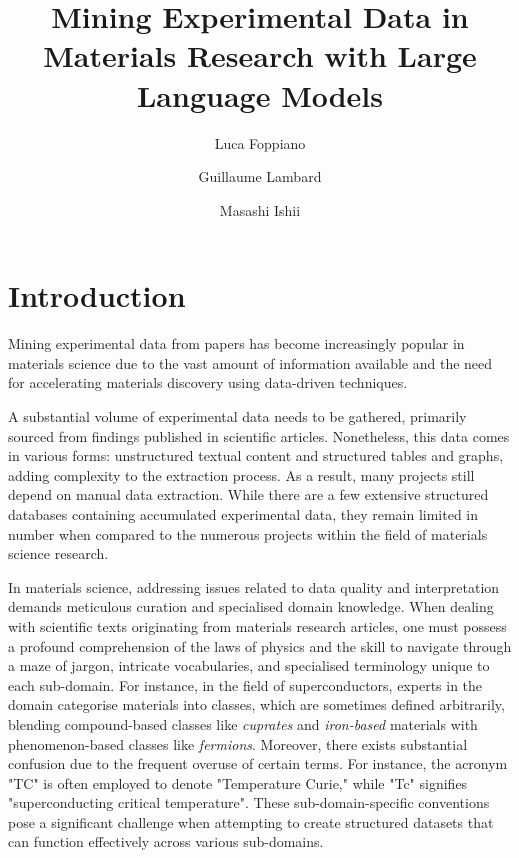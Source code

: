 \documentclass[a4paper]{article}
\title{Mining Experimental Data in Materials Research with Large Language Models}
\author[1]{Luca Foppiano}
\author[1]{Guillaume Lambard}
\author[1]{Masashi Ishii}
\affil[1]{NIMS}
\begin{document}
\maketitle

\section{Introduction}

Mining experimental data from papers has become increasingly popular in materials science due to the vast amount of information available and the need for accelerating materials discovery using data-driven techniques.

A substantial volume of experimental data needs to be gathered, primarily sourced from findings published in scientific articles.
Nonetheless, this data comes in various forms: unstructured textual content and structured tables and graphs, adding complexity to the extraction process. 
As a result, many projects still depend on manual data extraction.
While there are a few extensive structured databases containing accumulated experimental data, they remain limited in number when compared to the numerous projects within the field of materials science research.

In materials science, addressing issues related to data quality and interpretation demands meticulous curation and specialised domain knowledge.
When dealing with scientific texts originating from materials research articles, one must possess a profound comprehension of the laws of physics and the skill to navigate through a maze of jargon, intricate vocabularies, and specialised terminology unique to each sub-domain. 
For instance, in the field of superconductors, experts in the domain categorise materials into classes, which are sometimes defined arbitrarily, blending compound-based classes like \textit{cuprates} and \textit{iron-based} materials with phenomenon-based classes like \textit{fermions}. 
Moreover, there exists substantial confusion due to the frequent overuse of certain terms. For instance, the acronym "TC" is often employed to denote "Temperature Curie," while "Tc" signifies "superconducting critical temperature". 
These sub-domain-specific conventions pose a significant challenge when attempting to create structured datasets that can function effectively across various sub-domains.
\end{document}
